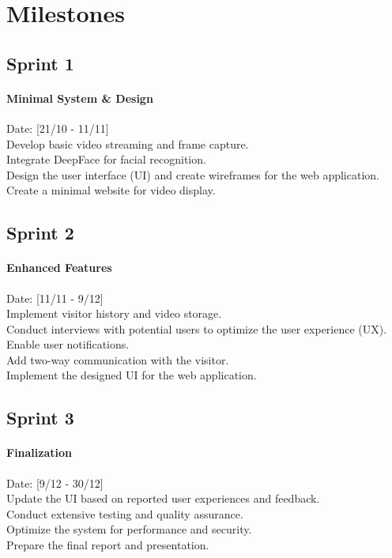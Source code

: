 \documentclass[a4 paper, 12pt]{article}
\begin{document}
\section{Milestones}
\subsection{Sprint 1}
\paragraph{Minimal System \& Design}
    Date: [21/10 - 11/11]\\
    Develop basic video streaming and frame capture.\\
    Integrate DeepFace for facial recognition.\\
    Design the user interface (UI) and create wireframes for the web application. \\
    Create a minimal website for video display.

\subsection{Sprint 2}
\paragraph{Enhanced Features}
    Date: [11/11 - 9/12]\\
    Implement visitor history and video storage.\\
    Conduct interviews with potential users to optimize the user experience (UX).\\
    Enable user notifications.\\
    Add two-way communication with the visitor. \\
    Implement the designed UI for the web application.

\subsection{Sprint 3}
\paragraph{Finalization}
    Date: [9/12 - 30/12]\\
    Update the UI based on reported user experiences and feedback. \\
    Conduct extensive testing and quality assurance.\\
    Optimize the system for performance and security.\\
    Prepare the final report and presentation.
\end{document}
